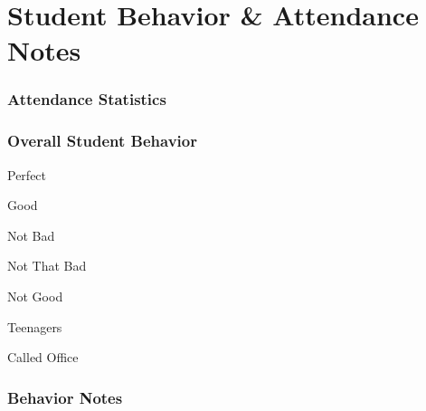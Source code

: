 \documentclass[10pt]{article}
\begin{document}
\section*{Student Behavior \& Attendance Notes}
\begin{framed}
\subsubsection*{Attendance Statistics}

\begin{description}
    \item[\small{Number of Absentees}] \uline{\hfill\null}
    \item[\small{Students Absent}] \uline{\hfill\null}
    \item \uline{\hfill\null}
    \item[\small{Ratio} \scriptsize{($absent/present$})] \uline{\hfill\null}
\end{description}

\subsubsection*{Overall Student Behavior}
\begin{todolist}
    \item Perfect
    \item Good
    \item Not Bad
    \item Not That Bad
    \item Not Good
    \item Teenagers
    \item Called Office
\end{todolist}

\subsubsection*{Behavior Notes}
\begin{description}
    \item \uline{\hfill\null}
    \item \uline{\hfill\null}
\end{description}

\vspace{0.2in}
\end{framed}

\end{document}
